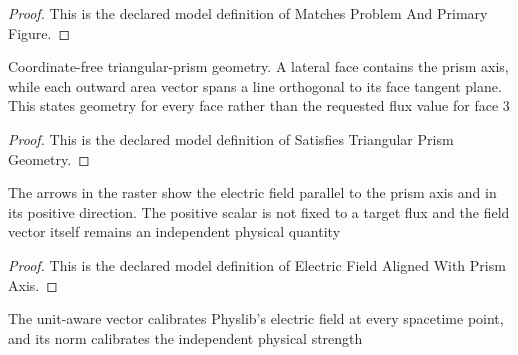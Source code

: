 \begin{proof}
  This is the declared model definition of Matches Problem And Primary Figure.
\end{proof}
\begin{definition}
  \label{def:physics:phyx-mini-0851:phyxminiproblems-problemphyxmini0851-satisfiestriangularprismgeometry}
  Coordinate-free triangular-prism geometry. A lateral face contains the prism axis, while each outward area vector spans a line orthogonal to its face tangent plane. This states geometry for every face rather than the requested flux value for face 3
\end{definition}
\begin{proof}
  This is the declared model definition of Satisfies Triangular Prism Geometry.
\end{proof}
\begin{definition}
  \label{def:physics:phyx-mini-0851:phyxminiproblems-problemphyxmini0851-electricfieldalignedwithprismaxis}
  The arrows in the raster show the electric field parallel to the prism axis and in its positive direction. The positive scalar is not fixed to a target flux and the field vector itself remains an independent physical quantity
\end{definition}
\begin{proof}
  This is the declared model definition of Electric Field Aligned With Prism Axis.
\end{proof}
\begin{definition}
  \label{def:physics:phyx-mini-0851:phyxminiproblems-problemphyxmini0851-satisfiesuniformelectricfieldmodel}
  The unit-aware vector calibrates Physlib's electric field at every spacetime point, and its norm calibrates the independent physical strength
\end{definition}
